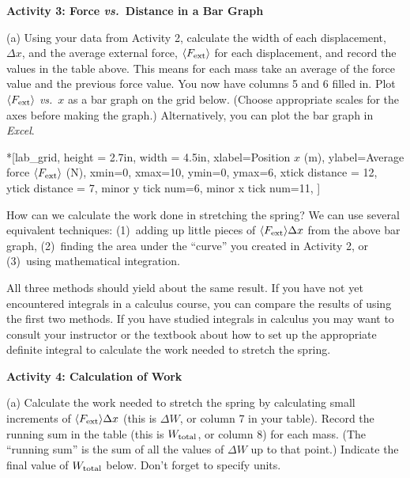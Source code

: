 \textbf{Activity 3: Force \textit{vs.}~Distance in a Bar Graph }

(a) Using your data from Activity 2, calculate the width of each displacement, \( \Delta x \), and the average external force, \(\langle F_{\rm ext} \rangle\) for each displacement, and record the values in the table above. This means for each mass take an average of the force value and the previous force value. You now have columns 5 and 6 filled in. Plot \( \langle F_{\rm ext} \rangle\) \textit{vs.}~$x$ as a bar graph on the grid below.  (Choose appropriate scales for the axes before making the graph.) Alternatively, you can plot the bar graph in \textit{Excel}.

\begin{lab_axis}*[lab_grid,
	height = 2.7in, width = 4.5in,
	xlabel={Position $x$ (m)},
	ylabel={Average force $\langle F_{\rm ext} \rangle$ (N)},
	xmin=0, xmax=10,
	ymin=0, ymax=6,
	xtick distance = 12,  %
	ytick distance = 7,
	minor y tick num=6,
	minor x tick num=11,
	]
\end{lab_axis}

How can we calculate the work done in stretching the spring? We can use several
equivalent techniques: (1)~adding up little pieces of \( \langle F_{\rm ext} 
\rangle \Delta x \) from the above bar graph,
(2)~finding the area under the ``curve'' you created in Activity 2, or 
(3)~using mathematical integration.

All three methods should yield about the same result. If you have not yet encountered
integrals in a calculus course, you can compare the results of using the first
two methods. If you have studied integrals in calculus you may want to consult
your instructor or the textbook about how to set up the appropriate definite
integral to calculate the work needed to stretch the spring. 

\pagebreak[3]
\textbf{Activity 4: Calculation of Work }

(a) Calculate the work needed to stretch the spring by calculating small increments of \( \langle F_{\rm ext} \rangle \Delta  x\) (this is \( \Delta W\), or column 7 in your table). Record the running sum in the table (this is \( W_{\rm total} \), or column 8) for each mass. (The ``running sum'' is the sum of all the values of \( \Delta W\) up to that point.) Indicate the final value of \( W_{\rm total} \) below. Don't forget to specify units.
\vspace{5mm}

